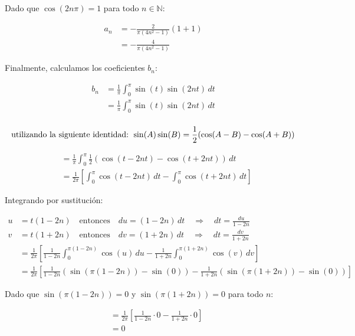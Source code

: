 \documentclass[12pt,a4paper]{report}
\begin{document}
\begin{enumerate}[label=\alph*),left=0pt]
\begin{itemize}[left=0pt]
  Dado que \(\cos(2n\pi) = 1\) para todo \(n \in \mathbb{N}\):
  
  $$
  \begin{aligned}
    a_n &= -\frac{2}{\pi (4n^2 - 1)} (1 + 1) \\
        &= -\frac{4}{\pi (4n^2 - 1)}
  \end{aligned}
  $$
  
  Finalmente, calculamos los coeficientes \(b_n\):
  
  $$
  \begin{aligned}
    b_n &= \frac{1}{\pi} \int_0^\pi \sin(t) \sin(2nt) \, dt \\
        &= \frac{1}{\pi} \int_0^\pi \sin(t) \sin(2nt) \, dt \\
  \end{aligned}
  $$

  $$
  \text{utilizando la siguiente identidad: }
  \sin(A)\sin(B) = \frac{1}{2} (\cos(A - B) - \cos(A + B)) \\
  $$

  $$
  \begin{aligned}
    &= \frac{1}{\pi} \int_0^\pi \frac{1}{2} (\cos(t - 2nt) - \cos(t + 2nt)) \, dt \\
    &= \frac{1}{2\pi} \left[ \int_0^\pi \cos(t - 2nt) \, dt - \int_0^\pi \cos(t + 2nt) \, dt \right]
  \end{aligned}
  $$
  
  Integrando por sustitución:
  
  $$
  \begin{aligned}
    u &= t(1 - 2n) \quad \text{entonces} \quad du = (1 - 2n) \, dt \quad \Longrightarrow \quad dt = \frac{du}{1 - 2n} \\
    v &= t(1 + 2n) \quad \text{entonces} \quad dv = (1 + 2n) \, dt \quad \Longrightarrow \quad dt = \frac{dv}{1 + 2n} \\
    &= \frac{1}{2\pi} \left[ \frac{1}{1 - 2n} \int_0^{\pi(1 - 2n)} \cos(u) \, du - \frac{1}{1 + 2n} \int_0^{\pi(1 + 2n)} \cos(v) \, dv \right] \\
    &= \frac{1}{2\pi} \left[ \frac{1}{1 - 2n} (\sin(\pi (1 - 2n)) - \sin(0)) - \frac{1}{1 + 2n} (\sin(\pi (1 + 2n)) - \sin(0)) \right]
  \end{aligned}
  $$
  
  Dado que \(\sin(\pi (1 - 2n)) = 0\) y \(\sin(\pi (1 + 2n)) = 0\) para todo \(n\):
  
  $$
  \begin{aligned}
    &= \frac{1}{2\pi} \left[ \frac{1}{1 - 2n} \cdot 0 - \frac{1}{1 + 2n} \cdot 0 \right] \\
    &= 0
  \end{aligned}
  $$
  

\end{itemize}
\end{enumerate}
\end{document}
